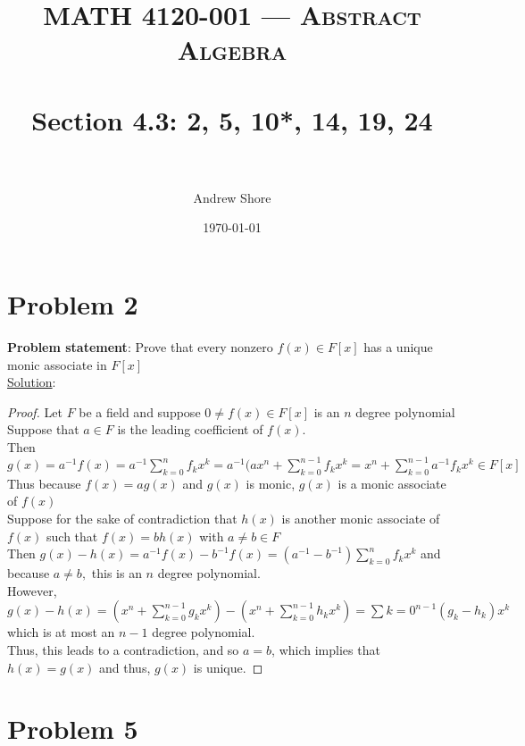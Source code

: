 \documentclass{article} %
\title{ 
\normalfont \normalsize 
\textsc{MATH 4120-001 --- Abstract Algebra} \\
\horrule{0.5pt} \\[0cm] %
\huge Section 4.3: 2, 5, 10*, 14, 19, 24 \\ %
\horrule{2pt} \\[0cm] %
}
\author{Andrew Shore} %
\date{\normalsize\today} %
\begin{document}
\maketitle %
\reversemarginpar
\section*{Problem 2}


\textbf{Problem statement}: Prove that every nonzero $f(x) \in F[x]$ has a unique monic associate in $F[x]$
\\

\underline{Solution}: 
\begin{addmargin}[1em]{0em}
\begin{proof}
Let $F$ be a field and suppose $0 \neq f(x) \in F[x]$ is an $n$ degree polynomial
\\Suppose that $a \in F$ is the leading coefficient of $f(x)$.
\\Then $g(x) = a^{-1}f(x) = a^{-1}\sum_{k=0}^{n}{f_kx^k}=a^{-1}(ax^n + \sum_{k=0}^{n-1}{f_kx^k} = x^n + \sum_{k=0}^{n-1}{a^{-1}f_kx^k} \in F[x]$
\\Thus because $f(x) = ag(x)$ and $g(x)$ is monic, $g(x)$ is a monic associate of $f(x)$
\\Suppose for the sake of contradiction that $h(x)$ is another monic associate of $f(x)$ such that $f(x) = bh(x)$ with $a \neq b \in F$
\\Then $g(x) - h(x) = a^{-1}f(x) - b^{-1}f(x) = (a^{-1} - b^{-1})\sum_{k=0}^{n}{f_kx^k}$ and because $a \neq b,$ this is an $n$ degree polynomial.
\\However, $g(x) - h(x) = (x^n + \sum_{k=0}^{n-1}{g_kx^k}) - (x^n + \sum_{k=0}^{n-1}{h_kx^k}) = \sum{k=0}^{n-1}{(g_k-h_k)x^k}$ which is at most an $n-1$ degree polynomial.
\\Thus, this leads to a contradiction, and so $a = b$, which implies that $h(x) = g(x)$ and thus, $g(x)$ is unique.
\end{proof}
\end{addmargin}    

\newpage

\section*{Problem 5}
\end{document}

